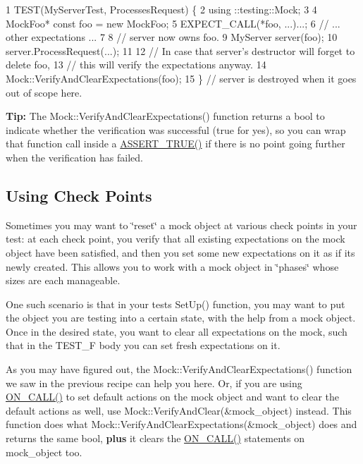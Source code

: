 \begin{DoxyCode}
1 TEST(MyServerTest, ProcessesRequest) \{
2   using ::testing::Mock;
3 
4   MockFoo* const foo = new MockFoo;
5   EXPECT\_CALL(*foo, ...)...;
6   // ... other expectations ...
7 
8   // server now owns foo.
9   MyServer server(foo);
10   server.ProcessRequest(...);
11 
12   // In case that server's destructor will forget to delete foo,
13   // this will verify the expectations anyway.
14   Mock::VerifyAndClearExpectations(foo);
15 \}  // server is destroyed when it goes out of scope here.
\end{DoxyCode}


{\bfseries Tip\+:} The {\ttfamily Mock\+::\+Verify\+And\+Clear\+Expectations()} function returns a {\ttfamily bool} to indicate whether the verification was successful ({\ttfamily true} for yes), so you can wrap that function call inside a {\ttfamily \hyperlink{gtest_8h_ae9244bfbda562e8b798789b001993fa5}{A\+S\+S\+E\+R\+T\+\_\+\+T\+R\+U\+E()}} if there is no point going further when the verification has failed.

\subsection*{Using Check Points}

Sometimes you may want to \char`\"{}reset\char`\"{} a mock object at various check points in your test\+: at each check point, you verify that all existing expectations on the mock object have been satisfied, and then you set some new expectations on it as if it\textquotesingle{}s newly created. This allows you to work with a mock object in \char`\"{}phases\char`\"{} whose sizes are each manageable.

One such scenario is that in your test\textquotesingle{}s {\ttfamily Set\+Up()} function, you may want to put the object you are testing into a certain state, with the help from a mock object. Once in the desired state, you want to clear all expectations on the mock, such that in the {\ttfamily T\+E\+S\+T\+\_\+F} body you can set fresh expectations on it.

As you may have figured out, the {\ttfamily Mock\+::\+Verify\+And\+Clear\+Expectations()} function we saw in the previous recipe can help you here. Or, if you are using {\ttfamily \hyperlink{gmock-spec-builders_8h_a5b12ae6cf84f0a544ca811b380c37334}{O\+N\+\_\+\+C\+A\+L\+L()}} to set default actions on the mock object and want to clear the default actions as well, use {\ttfamily Mock\+::\+Verify\+And\+Clear(\&mock\+\_\+object)} instead. This function does what {\ttfamily Mock\+::\+Verify\+And\+Clear\+Expectations(\&mock\+\_\+object)} does and returns the same {\ttfamily bool}, {\bfseries plus} it clears the {\ttfamily \hyperlink{gmock-spec-builders_8h_a5b12ae6cf84f0a544ca811b380c37334}{O\+N\+\_\+\+C\+A\+L\+L()}} statements on {\ttfamily mock\+\_\+object} too.

